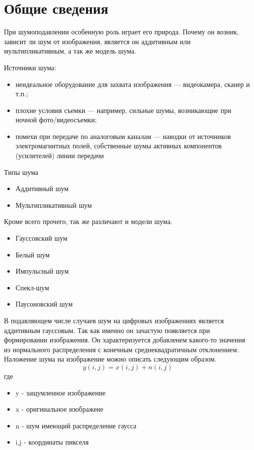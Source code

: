 \graphicspath{{../images/}}
\section{Общие сведения}
При шумоподавлении особенную роль играет его природа. Почему он возник, зависит ли шум от изображения, является он аддитивным
или мультипликативным, а так же модель шума. 

Источники шума\cite{Gonzalez}:
\begin{itemize}
	\item неидеальное оборудование для захвата изображения — видеокамера, сканер и
	т.п.;
	\item плохие условия съемки — например, сильные шумы, возникающие при
	ночной фото/видеосъемки;
	\item помехи при передаче по аналоговым каналам — наводки от источников
	электромагнитных полей, собственные шумы активных компонентов
	(усилителей) линии передачи
\end{itemize}

Типы шума
\begin{itemize}
	\item Аддитивный шум
	\item Мультипликативный шум
\end{itemize}

Кроме всего прочего, так же различают и модели шума.
\begin{itemize}
	\item Гауссовский шум
	\item Белый шум
	\item Импульсный шум
	\item Спекл-шум
	\item Паусоновский шум
\end{itemize}

В подавляющем числе случаев шум на цифровых изображениях является аддитивным гауссовым. Так
как именно он зачастую появляется при формировании изображения. Он характеризуется добавленем какого-то
значения из нормального распределения с конечным среднеквадратичным отклонением. Наложение шума
на изображение можно описать следующим образом.
\begin{equation}\label{eModelNoise}
	y(i,j)=x(i,j)+n(i,j)
\end{equation}
где
\begin{itemize}
	\item y - защумленное изображение
	\item x - оригинальное изображеие
	\item n - шум имеющий распределение гаусса
	\item i,j - координаты пикселя
\end{itemize}


